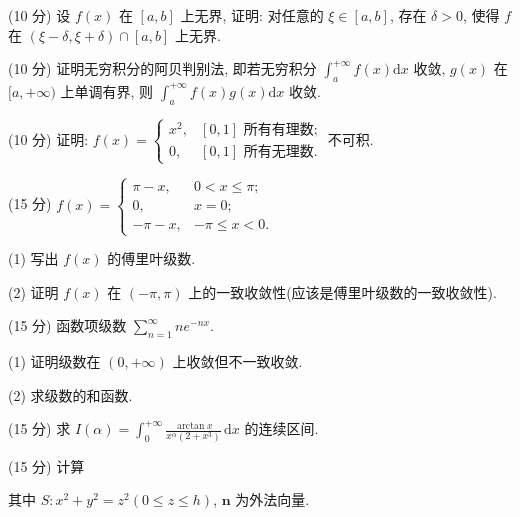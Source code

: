 (10 分) 设 $f(x)$ 在 $[a, b]$ 上无界, 证明: 对任意的 $\xi \in [a, b]$, 存在 $\delta > 0$, 使得 $f$ 在 $(\xi - \delta, \xi + \delta) \cap [a, b]$ 上无界.\par
\par{}
(10 分) 证明无穷积分的阿贝判别法, 即若无穷积分 $\int_{a}^{+\infty} f(x) \mathrm{d}x$ 收敛, $g(x)$ 在 $[a, +\infty)$ 上单调有界, 则 $\int_{a}^{+\infty} f(x) g(x) \mathrm{d}x$ 收敛.\par
\par{}
(10 分) 证明: $f(x) = \begin{cases} x^2, & [0,1] \text{ 所有有理数;} \\ 0, & [0,1] \text{ 所有无理数.} \end{cases}$ 不可积.\par
\par{}
(15 分) $f(x) = \begin{cases} \pi - x, & 0 < x \leq \pi; \\ 0, & x = 0; \\ -\pi - x, & -\pi \leq x < 0. \end{cases}$\par
(1) 写出 $f(x)$ 的傅里叶级数.\par
(2) 证明 $f(x)$ 在 $(- \pi, \pi)$ 上的一致收敛性(应该是傅里叶级数的一致收敛性).\par
\par{}
(15 分) 函数项级数 $\sum_{n=1}^{\infty} ne^{-nx}$.\par
(1) 证明级数在 $(0, +\infty)$ 上收敛但不一致收敛.\par
(2) 求级数的和函数.\par
\par{}
(15 分) 求 $I(\alpha) = \int_{0}^{+\infty} \frac{\arctan x}{x^{\alpha}(2 + x^{3})} \, \mathrm{d}x$ 的连续区间.\par
\par{}
\par{}
(15 分) 计算\par
\nopagebreak[4]
其中 $S: x^{2} + y^{2} = z^{2} (0 \leq z \leq h)$, $\pmb{n}$ 为外法向量.\par
